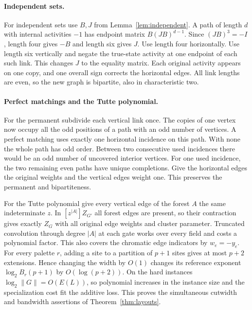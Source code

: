 \documentclass[11pt]{article}
\theoremstyle{definition}
\begin{document}
\paragraph{Independent sets.}

For independent sets use \(B,J\) from Lemma~\ref{lem:independent}. A path of length \(d\) with internal activities \(-1\) has endpoint matrix \(B(JB)^{d-1}\). Since \((JB)^3=-I\), length four gives \(-B\) and length six gives \(J\). Use length four horizontally. Use length six vertically and negate the true-state activity at one endpoint of each such link. This changes \(J\) to the equality matrix. Each original activity appears on one copy, and one overall sign corrects the horizontal edges. All link lengths are even, so the new graph is bipartite, also in characteristic two.

\paragraph{Perfect matchings and the Tutte polynomial.}
For the permanent subdivide each vertical link once. The copies of one vertex now occupy all the odd positions of a path with an odd number of vertices. A perfect matching uses exactly one horizontal incidence on this path. With none the whole path has odd order. Between two consecutive used incidences there would be an odd number of uncovered interior vertices. For one used incidence, the two remaining even paths have unique completions. Give the horizontal edges the original weights and the vertical edges weight one. This preserves the permanent and bipartiteness.

For the Tutte polynomial give every vertical edge of the forest \(A\) the same indeterminate \(z\). In \([z^{|A|}]Z_{G'}\) all forest edges are present, so their contraction gives exactly \(Z_G\) with all original edge weights and cluster parameter. Truncated convolution through degree \(|A|\) at each gate works over every field and costs a polynomial factor. This also covers the chromatic edge indicators by \(w_e=-y_e\). For every palette \(r\), adding a site to a partition of \(p+1\) sites gives at most \(p+2\) extensions. Hence changing the width by \(O(1)\) changes its reference exponent \(\log_2 B_r(p+1)\) by \(O(\log(p+2))\). On the hard instances \(\log_2 \|G\|=O(E(L))\), so polynomial increases in the instance size and the specialization cost fit the additive loss. This proves the simultaneous cutwidth and bandwidth assertions of Theorem~\ref{thm:layouts}.
\end{document}
